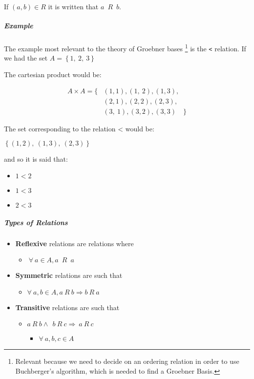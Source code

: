 \documentclass[a4paper,11pt,twoside]{article}
\begin{document}
If \((a,b)\in R\) it is written that \(a\enspace R \enspace b\).
\subparagraph{Example}
\label{sec:orga52d81f}
The example most relevant to the theory of Groebner bases \footnote{Relevant because we need to decide on an ordering relation in
order to use Buchberger's algorithm, which is needed to find a
Groebner Basis.} is
the \texttt{<} relation. If we had the set \(A = \left\{ 1,\ 2,\ 3 \right\}\)

The cartesian product would be:

  \begin{align*}
A\times A=\Bigg\{	&\left(1,1\right),\left(1,\ 2\right),\left(1,3\right), \\
			&\left(2,1\right),\left(2,2\right),\left(2,3\right), \\
			&\left(3,\
1\right),\left(3,2\right),\left(3,3\right)\quad\Bigg\}
\end{align*}

The set corresponding to the relation < would be:

\(\left\{ \left( 1,2 \right),\ \left( 1,3 \right),\ \left( 2,3 \right) \right\}\)

and so it is said that:

\begin{itemize}
\item \(1<2\)
\item \(1<3\)
\item \(2<3\)
\end{itemize}

\subparagraph{Types of Relations}
\label{sec:org6926688}

\begin{itemize}
\item \textbf{Reflexive} relations are relations where
\begin{itemize}
\item \(\ \forall\ a \in A, a\enspace R \enspace a\)
\end{itemize}
\item \textbf{Symmetric} relations are such that
\begin{itemize}
\item \(\forall\ a,b \in A, a\ R\ b \Rightarrow b\ R\ a\)
\end{itemize}
\item \textbf{Transitive} relations are such that
\begin{itemize}
\item \(a\ R\ b \land \ \ b\ R\ c \Rightarrow \ a\ R\ c\)
\begin{itemize}
\item \(\forall\ a,b,c \in A\)
\end{itemize}
\end{itemize}
\end{itemize}
\end{document}
